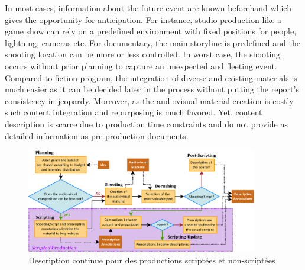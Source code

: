 \begin{itemize}
In most cases, information about the future event are known beforehand which gives the opportunity for anticipation. For instance, studio production like a game show can rely on a predefined environment with fixed positions for people, lightning, cameras etc. For documentary, the main storyline is predefined and the shooting location can be more or less controlled. In worst case, the shooting occurs without prior planning to capture an unexpected and fleeting event. Compared to fiction program, the integration of diverse and existing materials is much easier as it can be decided later in the process without putting the report's consistency in jeopardy. Moreover, as the audiovisual material creation is costly such content integration and repurposing is much favored. Yet, content description is scarce due to production time constraints and do not provide as detailed information as pre-production documents. 
\end{itemize}


\begin{figure}[ht!]
\centering
\includegraphics[width=0.9\textwidth]{./images/Approach-Logigram-v2.png}
\caption{Description continue pour des productions scriptées et non-scriptées}
\label{img:strat-annot}
\end{figure}

